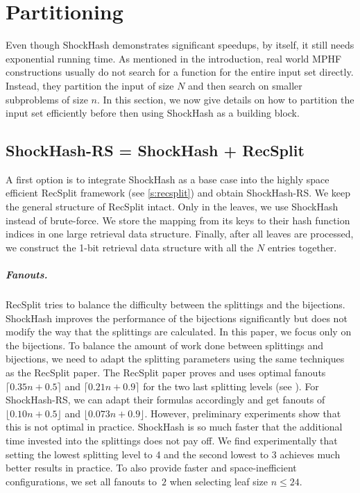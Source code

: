 \documentclass[a4paper,USenglish,cleveref]{lipics-v2021}
\newcommand{\myparagraph}[1]{\subparagraph*{#1}}
\begin{document}
%

\section{Partitioning}\label{s:partitioning}
Even though ShockHash demonstrates significant speedups, by itself, it still needs exponential running time.
As mentioned in the introduction, real world MPHF constructions usually do not search for a function for the entire input set directly.
Instead, they partition the input of size $N$ and then search on smaller subproblems of size $n$.
In this section, we now give details on how to partition the input set efficiently before then using ShockHash as a building block.

\subsection{ShockHash-RS = ShockHash + RecSplit}\label{s:shockhashInRecSplit}
A first option is to integrate ShockHash as a base case into the highly space efficient RecSplit framework (see \cref{s:recsplit}) and obtain ShockHash-RS.
We keep the general structure of RecSplit intact.
Only in the leaves, we use ShockHash instead of brute-force.
We store the mapping from its keys to their hash function indices in one large retrieval data structure.
Finally, after all leaves are processed, we construct the 1-bit retrieval data structure with all the $N$ entries together.
%

\myparagraph{Fanouts.}
RecSplit tries to balance the difficulty between the splittings and the bijections.
ShockHash improves the performance of the bijections significantly but does not modify the way that the splittings are calculated.
In this paper, we focus only on the bijections.
To balance the amount of work done between splittings and bijections, we need to adapt the splitting parameters using the same techniques as the RecSplit paper.
The RecSplit paper proves and uses optimal fanouts $\lceil 0.35 n + 0.5 \rceil$ and $\lceil 0.21 n + 0.9 \rceil$ for the two last splitting levels (see \cite[Section 5.4]{esposito2020recsplit}).
For ShockHash-RS, we can adapt their formulas accordingly and get fanouts of $\lfloor 0.10 n + 0.5\rfloor$ and $\lfloor 0.073 n + 0.9 \rfloor$.
However, preliminary experiments show that this is not optimal in practice.
ShockHash is so much faster that the additional time invested into the splittings does not pay off.
We find experimentally that setting the lowest splitting level to 4 and the second lowest to 3 achieves much better results in practice.
To also provide faster and space-inefficient configurations, we set all fanouts to~$2$ when selecting leaf size $n \leq 24$.
%
\end{document}
